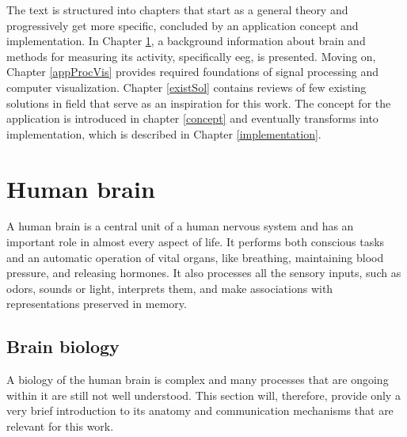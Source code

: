 The text is structured into chapters that start as a general theory and
progressively get more specific, concluded by an application concept and
implementation. In Chapter \ref{humanBrain}, a background information about brain
and methods for measuring its activity, specifically \gls{eeg}, is presented. Moving
on, Chapter \ref{appProcVis} provides required foundations of signal processing
and computer visualization. Chapter \ref{existSol} contains reviews of few existing
solutions in field that serve as an inspiration for this work. The concept for the application is
introduced in chapter \ref{concept} and eventually transforms into
implementation, which is described in Chapter \ref{implementation}.
 
\chapter{Human brain} \label{humanBrain}
A human brain is a central unit of a human nervous system and has an important role in almost
every aspect of life. It performs both conscious tasks and an automatic operation
of vital organs, like breathing, maintaining blood pressure, and releasing
hormones. It also processes all the sensory inputs, such as odors, sounds or light,
interprets them, and make associations with representations preserved in memory.
\section{Brain biology}
A biology of the human brain is complex and many processes that are ongoing within it
are still not well understood. This section will, therefore, provide only a
very brief introduction to its anatomy and communication mechanisms that are
relevant for this work.
